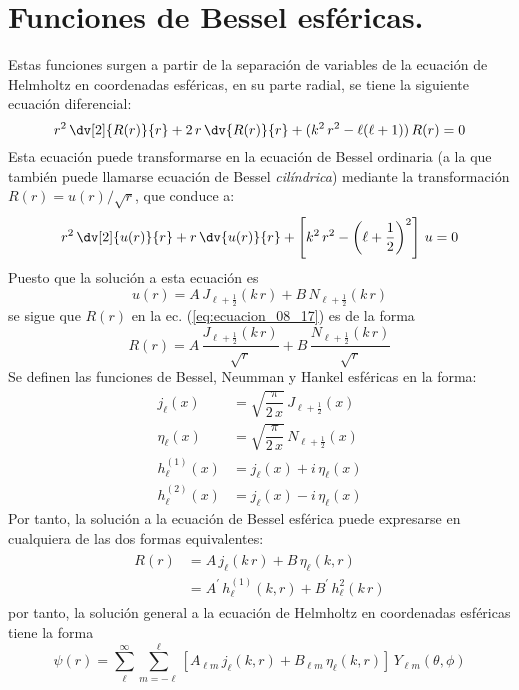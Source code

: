 \section{Funciones de Bessel esféricas.}
Estas funciones surgen a partir de la separación de variables de la ecuación de Helmholtz en coordenadas esféricas, en su parte radial, se tiene la siguiente ecuación diferencial:
\begin{equation}
r^{2} \, \dv[2]{R(r)}{r} + 2 \, r \, \dv{R(r)}{r} + (k^{2} \, r^{2} - \ell (\ell + 1)) \, R(r) = 0
\label{eq:ecuacion_08_17}
\end{equation}
Esta ecuación puede transformarse en la ecuación de Bessel ordinaria (a la que también puede llamarse ecuación de Bessel \emph{cilíndrica}) mediante la transformación $R(r) = u(r) /\sqrt{r}$, que conduce a:
\[ r^{2} \, \dv[2]{u(r)}{r} + r \, \dv{u(r)}{r} + \left[ k^{2} \, r^{2} -  \left( \ell + \dfrac{1}{2} \right)^{2} \right] \, u = 0\]
Puesto que la solución a esta ecuación es
\[ u(r) = A \, J_{\ell+\frac{1}{2}} (k \, r) + B \, N_{\ell+\frac{1}{2}} (k \, r) \]
se sigue que $R(r)$ en la ec. (\ref{eq:ecuacion_08_17}) es de la forma
\[ R(r) = A \, \dfrac{J_{\ell+\frac{1}{2}} (k \, r)}{\sqrt{r}} + B \, \dfrac{N_{\ell+\frac{1}{2}} (k \, r)}{\sqrt{r}}  \]
Se definen las funciones de Bessel, Neumman y Hankel esféricas en la forma:
\begin{align*}
j_{\ell} (x) &= \sqrt{\dfrac{\pi}{2 \, x}} \, J_{\ell+\frac{1}{2}} (x) \\
\eta_{\ell} (x) &= \sqrt{\dfrac{\pi}{2 \, x}} \, N_{\ell+\frac{1}{2}} (x) \\
h_{\ell}^{(1)} (x) &= j_{\ell} (x) + i \, \eta_{\ell} (x) \\
h_{\ell}^{(2)} (x) &= j_{\ell} (x) - i \, \eta_{\ell} (x)
\end{align*}
Por tanto, la solución a la ecuación de Bessel esférica puede expresarse en cualquiera de las dos formas equivalentes:
\begin{align}
\begin{aligned}
R(r) &= A \, j_{\ell} (k \, r) +  B \, \eta_{\ell} (k , r) \\
&= A^{\prime} \, h_{\ell}^{(1)} (k , r) + B^{\prime} \, h_{\ell}^{2} (k \,r)
\end{aligned}
\label{eq:ecuacion_08_18}
\end{align}
por tanto, la solución general a la ecuación de Helmholtz en coordenadas esféricas tiene la forma
\[ \psi (r) = \sum_{\ell}^{\infty} \sum_{m=-\ell}^{\ell} \left[ A_{\ell m} \, j_{\ell} (k , r) + B_{\ell m} \, \eta_{\ell} (k , r) \right] \, Y_{\ell m} (\theta, \phi)  \]
